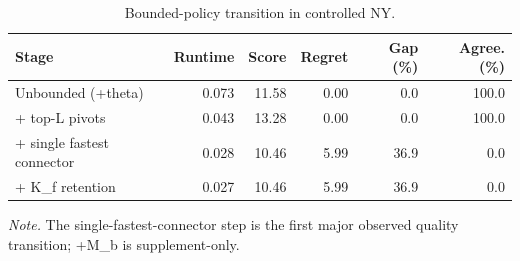 \begin{table}[t]
\centering
\caption{Bounded-policy transition in controlled NY.}
\begin{tabular}{lrrrrr}
\toprule
Stage & Runtime & Score & Regret & Gap (\%) & Agree. (\%) \\
\midrule
Unbounded (+theta) & 0.073 & 11.58 & 0.00 & 0.0 & 100.0 \\
+ top-L pivots & 0.043 & 13.28 & 0.00 & 0.0 & 100.0 \\
+ single fastest connector & 0.028 & 10.46 & 5.99 & 36.9 & 0.0 \\
+ K\_f retention & 0.027 & 10.46 & 5.99 & 36.9 & 0.0 \\
\bottomrule
\end{tabular}
\end{table}
\textit{Note.} The single-fastest-connector step is the first major observed quality transition; +M_b is supplement-only.
